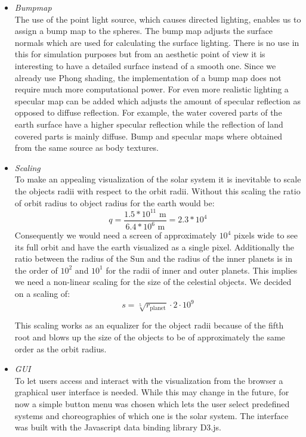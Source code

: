 \documentclass[a4paper]{article}
\begin{document}
\begin{itemize}
\item \emph{Bumpmap}\\
  The use of the point light source, which causes directed lighting, enables us to assign a bump map
  to the spheres. The bump map adjusts the surface normals which are used for calculating the
  surface lighting. There is no use in this for simulation purposes but from an aesthetic point of
  view it is interesting to have a detailed surface instead of a smooth one. Since we already use
  Phong shading, the implementation of a bump map does not require much more computational power.
  For even more realistic lighting a specular map can be added which adjusts the amount of specular
  reflection as opposed to diffuse reflection. For example, the water covered parts of the earth
  surface have a higher specular reflection while the reflection of land covered parts is mainly
  diffuse. Bump and specular maps where obtained from the same source as body textures.


\item \emph{Scaling}\\
  To make an appealing visualization of the solar system it is inevitable to scale the objects radii
  with respect to the orbit radii. Without this scaling the ratio of orbit radius to object radius
  for the earth would be:
\begin{equation}
q = \frac{1.5 *10^{11} \mbox{ m}}{6.4*10^6 \mbox{ m}} = 2.3 *10^4
\end{equation}
Consequently we would need a screen of approximately $10^4$ pixels wide to see its full orbit and
have the earth visualized as a single pixel. Additionally the ratio between the radius of the Sun
and the radius of the inner planets is in the order of $10^2$ and $10^1$ for the radii of inner and
outer planets. This implies we need a non-linear scaling for the size of the celestial objects. We
decided on a scaling of:
\begin{equation}
s = \sqrt[5]{r_{\mbox{planet}}} \cdot 2 \cdot 10^9
\end{equation}

This scaling works as an equalizer for the object radii because of the fifth root and blows up the
size of the objects to be of approximately the same order as the orbit radius.

\item \emph{GUI}\\
  To let users access and interact with the visualization from the browser a graphical user
  interface is needed. While this may change in the future, for now a simple button menu was chosen
  which lets the user select predefined systems and choreographies of which one is the solar system.
  The interface was built with the Javascript data binding library D3.js. \cite{d3lib}


\end{itemize}
\end{document}
